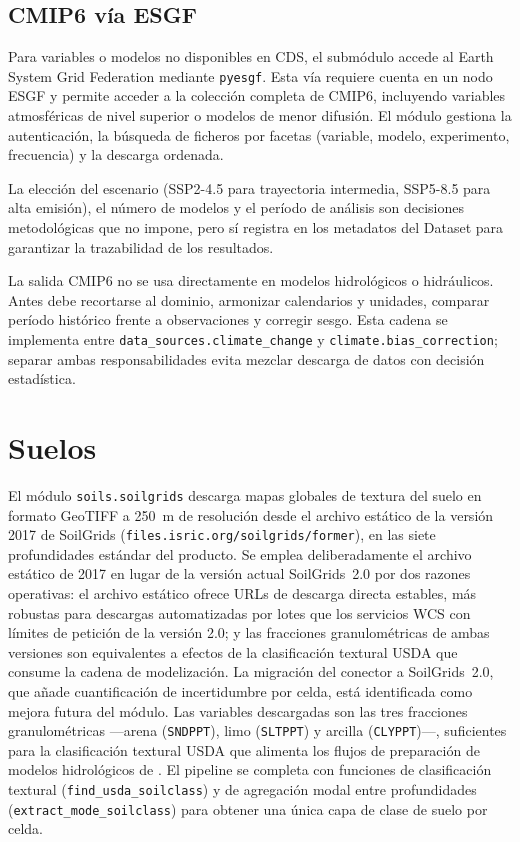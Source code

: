 \subsection{CMIP6 vía ESGF}

Para variables o modelos no disponibles en CDS, el submódulo  accede al Earth System Grid Federation \parencite{esgfportal} mediante \texttt{pyesgf}. Esta vía requiere cuenta en un nodo ESGF y permite acceder a la colección completa de CMIP6, incluyendo variables atmosféricas de nivel superior o modelos de menor difusión. El módulo gestiona la autenticación, la búsqueda de ficheros por facetas (variable, modelo, experimento, frecuencia) y la descarga ordenada.

La elección del escenario (SSP2-4.5 para trayectoria intermedia, SSP5-8.5 para alta emisión), el número de modelos y el período de análisis son decisiones metodológicas que \hydra no impone, pero sí registra en los metadatos del Dataset para garantizar la trazabilidad de los resultados.

La salida CMIP6 no se usa directamente en modelos hidrológicos o hidráulicos. Antes debe recortarse al dominio, armonizar calendarios y unidades, comparar período histórico frente a observaciones y corregir sesgo. Esta cadena se implementa entre \texttt{data\_sources.climate\_change} y \texttt{climate.bias\_correction}; separar ambas responsabilidades evita mezclar descarga de datos con decisión estadística.

\section{Suelos}

El módulo \texttt{soils.soilgrids} descarga mapas globales de textura del suelo en formato GeoTIFF a 250~m de resolución desde el archivo estático de la versión 2017 de SoilGrids (\texttt{files.isric.org/soilgrids/former}), en las siete profundidades estándar del producto. Se emplea deliberadamente el archivo estático de 2017 en lugar de la versión actual SoilGrids~2.0 \parencite{poggio2021soilgrids} por dos razones operativas: el archivo estático ofrece URLs de descarga directa estables, más robustas para descargas automatizadas por lotes que los servicios WCS con límites de petición de la versión 2.0; y las fracciones granulométricas de ambas versiones son equivalentes a efectos de la clasificación textural USDA que consume la cadena de modelización. La migración del conector a SoilGrids~2.0, que añade cuantificación de incertidumbre por celda, está identificada como mejora futura del módulo. Las variables descargadas son las tres fracciones granulométricas —arena (\texttt{SNDPPT}), limo (\texttt{SLTPPT}) y arcilla (\texttt{CLYPPT})—, suficientes para la clasificación textural USDA que alimenta los flujos de preparación de modelos hidrológicos de \hydra. El pipeline se completa con funciones de clasificación textural (\texttt{find\_usda\_soilclass}) y de agregación modal entre profundidades (\texttt{extract\_mode\_soilclass}) para obtener una única capa de clase de suelo por celda.

